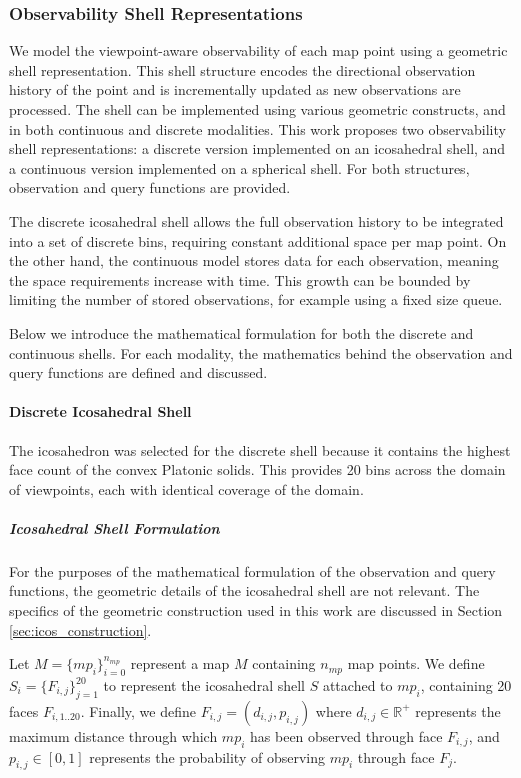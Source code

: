 \subsubsection{Observability Shell Representations}

We model the viewpoint-aware observability of each map point using a geometric shell representation. This shell structure encodes the directional observation history of the point and is incrementally updated as new observations are processed. The shell can be implemented using various geometric constructs, and in both continuous and discrete modalities. This work proposes two observability shell representations: a discrete version implemented on an icosahedral shell, and a continuous version implemented on a spherical shell. For both structures, observation and query functions are provided.

The discrete icosahedral shell allows the full observation history to be integrated into a set of discrete bins, requiring constant additional space per map point. On the other hand, the continuous model stores data for each observation, meaning the space requirements increase with time. This growth can be bounded by limiting the number of stored observations, for example using a fixed size queue.

Below we introduce the mathematical formulation for both the discrete and continuous shells. For each modality, the mathematics behind the observation and query functions are defined and discussed.

\paragraph{Discrete Icosahedral Shell}

The icosahedron was selected for the discrete shell because it contains the highest face count of the convex Platonic solids. This provides 20 bins across the domain of viewpoints, each with identical coverage of the domain.

\subparagraph{Icosahedral Shell Formulation}

For the purposes of the mathematical formulation of the observation and query functions, the geometric details of the icosahedral shell are not relevant. The specifics of the geometric construction used in this work are discussed in Section \ref{sec:icos_construction}.

Let $M=\{mp_i\}_{i=0}^{n_{mp}}$ represent a map $M$ containing $n_{mp}$ map points. We define $S_i=\{F_{i,j}\}_{j=1}^{20}$ to represent the icosahedral shell $S$ attached to $mp_i$, containing 20 faces $F_{i,{1..20}}$. Finally, we define $F_{i,j}=(d_{i,j}, p_{i,j})$ where $d_{i,j}\in\mathbb{R}^+$ represents the maximum distance through which $mp_i$ has been observed through face $F_{i,j}$, and $p_{i,j}\in[0,1]$ represents the probability of observing $mp_i$ through face $F_j$.


